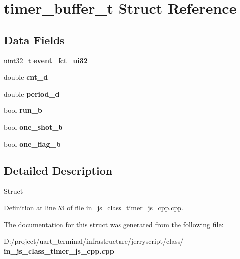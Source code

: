 \section{timer\+\_\+buffer\+\_\+t Struct Reference}
\label{structtimer__buffer__t}
\subsection*{Data Fields}
\begin{DoxyCompactItemize}
\item 
\mbox{\label{structtimer__buffer__t_a35fdef1075b932b3f5f5166d991d2f54}} 
uint32\+\_\+t {\bfseries event\+\_\+fct\+\_\+ui32}
\item 
\mbox{\label{structtimer__buffer__t_a2942bdd9a2f3f057519e202e05eb8d00}} 
double {\bfseries cnt\+\_\+d}
\item 
\mbox{\label{structtimer__buffer__t_a5bf3bfe36db280ed287ee2fa54a11a78}} 
double {\bfseries period\+\_\+d}
\item 
\mbox{\label{structtimer__buffer__t_a1acbe18eaee5d770c30c42bcd8967a1d}} 
bool {\bfseries run\+\_\+b}
\item 
\mbox{\label{structtimer__buffer__t_a642179e2722248ab52c69e25a92f29c6}} 
bool {\bfseries one\+\_\+shot\+\_\+b}
\item 
\mbox{\label{structtimer__buffer__t_acbb61151671ee1d32c3bdc03678b25a9}} 
bool {\bfseries one\+\_\+flag\+\_\+b}
\end{DoxyCompactItemize}


\subsection{Detailed Description}
Struct 

Definition at line 53 of file in\+\_\+js\+\_\+class\+\_\+timer\+\_\+js\+\_\+cpp.\+cpp.



The documentation for this struct was generated from the following file\+:\begin{DoxyCompactItemize}
\item 
D\+:/project/uart\+\_\+terminal/infrastructure/jerryscript/class/\textbf{ in\+\_\+js\+\_\+class\+\_\+timer\+\_\+js\+\_\+cpp.\+cpp}\end{DoxyCompactItemize}
